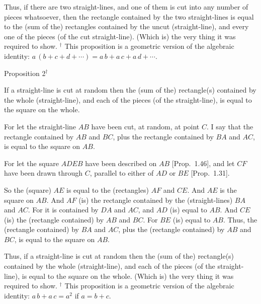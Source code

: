 Thus, if there are two straight-lines, and one of them is cut into any number 
of pieces whatsoever, then the rectangle contained by the two straight-lines is
equal to the (sum of the) rectangles contained by the uncut (straight-line), and every one of the pieces (of the cut straight-line). (Which is) the very thing it was required to show.
{\footnotesize \noindent$^\dag$ This proposition is a geometric version
of the algebraic identity: $a \,(b+c+d+\cdots) = a\,b + a\,c + a\,d + \cdots$.}


\begin{center}
{\large Proposition 2$^\dag$}
\end{center}

If a straight-line is cut at random then the (sum of the) rectangle(s) contained by the whole
(straight-line), and each of the pieces (of the straight-line), is equal to the square on the whole.

\epsfysize=2.2in
\centerline{}

For let the straight-line $AB$ have been cut, at random, at point $C$. I say that the
rectangle contained by $AB$ and $BC$, plus the rectangle contained by 
$BA$ and $AC$, is equal to the square on $AB$.

For let the square $ADEB$ have been described on $AB$ [Prop.~1.46], and
let $CF$ have been drawn through $C$, parallel to either of $AD$ or $BE$ [Prop.~1.31].

So the (square) $AE$ is equal to the (rectangles) $AF$ and $CE$. And $AE$ is the square on $AB$.  And $AF$ (is) the rectangle contained by the (straight-lines) $BA$ and $AC$. For it is contained by $DA$ and $AC$, and $AD$ (is) equal to $AB$. 
And $CE$ (is) the (rectangle contained) by $AB$ and $BC$. For $BE$ (is) equal
to $AB$. Thus, the (rectangle contained) by $BA$ and $AC$, plus the
(rectangle contained) by $AB$ and $BC$, is equal to the square on $AB$.

Thus, if a straight-line is cut at random then the (sum of the) rectangle(s) contained by the whole
(straight-line), and each of the pieces (of the straight-line), is equal to the square on the whole. (Which is) the very thing it was required to show.
{\footnotesize \noindent$^\dag$ This proposition is a geometric version
of the algebraic identity: $a\,b+a\,c=a^2$ if $a=b+c$.}


